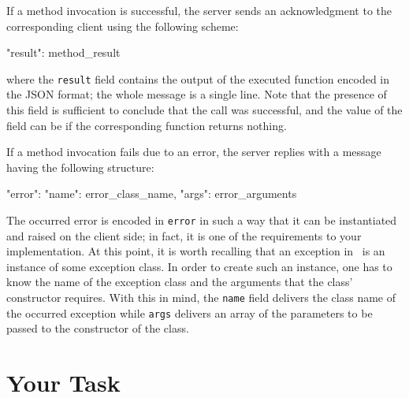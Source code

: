 \documentclass[a4paper]{article}
\begin{document}
If a method invocation is successful, the server sends an acknowledgment to the
corresponding client using the following scheme:
\begin{json}
{
    "result": method_result
}
\end{json}
where the \texttt{result} field contains the output of the executed function
encoded in the JSON format; the whole message is a single line. Note that the
presence of this field is sufficient to conclude that the call was successful,
and the value of the field can be  if the corresponding function
returns nothing.

If a method invocation fails due to an error, the server replies with a message
having the following structure:
\begin{json}
{
    "error": {
        "name": error_class_name,
        "args": error_arguments
    }
}
\end{json}
The occurred error is encoded in \texttt{error} in such a way that it can be
instantiated and raised on the client side; in fact, it is one of the
requirements to your implementation. At this point, it is worth recalling that
an exception in \python\ is an instance of some exception class. In order to
create such an instance, one has to know the name of the exception class and the
arguments that the class' constructor requires. With this in mind, the
\texttt{name} field delivers the class name of the occurred exception while
\texttt{args} delivers an array of the parameters to be passed to the
constructor of the class.

\section{Your Task}
\end{document}
